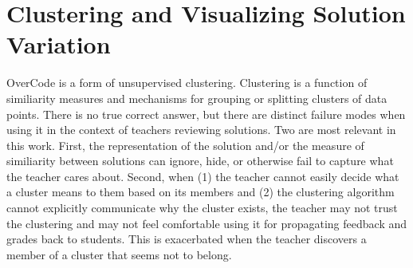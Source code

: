 


\section{Clustering and Visualizing Solution Variation}

OverCode is a form of unsupervised clustering. Clustering is a function of similiarity measures and mechanisms for grouping or splitting clusters of data points. There is no true correct answer, but there are distinct failure modes when using it in the context of teachers reviewing solutions. Two are most relevant in this work. First, the representation of the solution and/or the measure of similiarity between solutions can ignore, hide, or otherwise fail to capture what the teacher cares about. Second, when (1) the teacher cannot easily decide what a cluster means to them based on its members and (2) the clustering algorithm cannot explicitly communicate why the cluster exists, the teacher may not trust the clustering and may not feel comfortable using it for propagating feedback and grades back to students. This is exacerbated when the teacher discovers a member of a cluster that seems not to belong.

